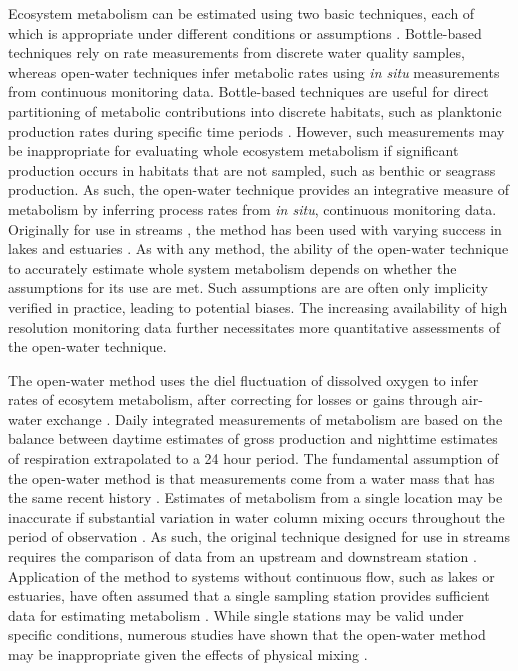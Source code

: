 \documentclass[letterpaper,12pt,oneside]{article}\usepackage[]{graphicx}\usepackage[]{color}
\begin{document}
Ecosystem metabolism can be estimated using two basic techniques, each of which is appropriate under different conditions or assumptions \citep{Kemp12}.   Bottle-based techniques rely on rate measurements from discrete water quality samples, whereas open-water techniques infer metabolic rates using \textit{in situ} measurements from continuous monitoring data.  Bottle-based techniques are useful for direct partitioning of metabolic contributions into discrete habitats, such as planktonic production rates during specific time periods \citep{Kemp12}.  However, such measurements may be inappropriate for evaluating whole ecosystem metabolism if significant production occurs in habitats that are not sampled, such as benthic or seagrass production.  As such, the open-water technique provides an integrative measure of metabolism by inferring process rates from \textit{in situ}, continuous monitoring data.  Originally for use in streams \citep{Odum56}, the method has been used with varying success in lakes \citep{Staehr10,Coloso11,Batt12} and estuaries \citep{Caffrey04,Hopkinson05,Caffrey13}.  As with any method, the ability of the open-water technique to accurately estimate whole system metabolism depends on whether the assumptions for its use are met.  Such assumptions are are often only implicity verified in practice, leading to potential biases.  The increasing availability of high resolution monitoring data further necessitates more quantitative assessments of the open-water technique.

The open-water method uses the diel fluctuation of dissolved oxygen to infer rates of ecosytem metabolism, after correcting for losses or gains through air-water exchange \citep{Kemp12}.  Daily integrated measurements of metabolism are based on the balance between daytime estimates of gross production and nighttime estimates of respiration extrapolated to a 24 hour period.  The fundamental assumption of the open-water method is that measurements come from a water mass that has the same recent history \citep{Needoba12}.  Estimates of metabolism from a single location may be inaccurate if substantial variation in water column mixing occurs throughout the period of observation \citep{Russell07}.  As such, the original technique designed for use in streams requires the comparison of data from an upstream and downstream station \citep{Odum56}.  Application of the method to systems without continuous flow, such as lakes or estuaries, have often assumed that a single sampling station provides sufficient data for estimating metabolism \cite{Staehr10}.  While single stations may be valid under specific conditions, numerous studies have shown that the open-water method may be inappropriate given the effects of physical mixing \citep{Ziegler98,Caffrey03,Coloso11,Batt12,Nidzieko14}.
\end{document}
